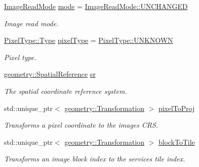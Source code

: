 \begin{DoxyCompactItemize}
\hyperlink{group___imagery_module_ga1db94ae833853b71ed501bb1ea8c1c24}{Image\+Read\+Mode} \hyperlink{structdg_1_1deepcore_1_1imagery_1_1_map_service_image_config_a889a9ec30f6e9aa31a2a02058b2e5598}{mode} = \hyperlink{namespacedg_1_1deepcore_1_1imagery_ga1db94ae833853b71ed501bb1ea8c1c24a46335765005ff44b1fe1e38e5d2ddfcc}{Image\+Read\+Mode\+::\+U\+N\+C\+H\+A\+N\+G\+ED}
\begin{DoxyCompactList}\small\item\em Image read mode. \end{DoxyCompactList}\item 
\hyperlink{namespacedg_1_1deepcore_1_1imagery_1_1_pixel_type_a5f0c62edf4601cbd15e52b381697069d}{Pixel\+Type\+::\+Type} \hyperlink{structdg_1_1deepcore_1_1imagery_1_1_map_service_image_config_a0ecef609731a868150ff3ef3faa2f2ae}{pixel\+Type} = \hyperlink{namespacedg_1_1deepcore_1_1imagery_1_1_pixel_type_a5f0c62edf4601cbd15e52b381697069dab23da115d8c27fe0e3a415fe7cdf8964}{Pixel\+Type\+::\+U\+N\+K\+N\+O\+WN}
\begin{DoxyCompactList}\small\item\em Pixel type. \end{DoxyCompactList}\item 
\hyperlink{classdg_1_1deepcore_1_1geometry_1_1_spatial_reference}{geometry\+::\+Spatial\+Reference} \hyperlink{structdg_1_1deepcore_1_1imagery_1_1_map_service_image_config_a55da203e4d34afdfdfe39f4f1fdafb90}{sr}
\begin{DoxyCompactList}\small\item\em The spatial coordinate reference system. \end{DoxyCompactList}\item 
std\+::unique\+\_\+ptr$<$ \hyperlink{structdg_1_1deepcore_1_1geometry_1_1_transformation}{geometry\+::\+Transformation} $>$ \hyperlink{structdg_1_1deepcore_1_1imagery_1_1_map_service_image_config_aae8a095c9f950f114e113e86b82ecf66}{pixel\+To\+Proj}
\begin{DoxyCompactList}\small\item\em Transforms a pixel coordinate to the image\textquotesingle{}s C\+RS. \end{DoxyCompactList}\item 
std\+::unique\+\_\+ptr$<$ \hyperlink{structdg_1_1deepcore_1_1geometry_1_1_transformation}{geometry\+::\+Transformation} $>$ \hyperlink{structdg_1_1deepcore_1_1imagery_1_1_map_service_image_config_a629792227fe086761b4dc6c608bdef28}{block\+To\+Tile}
\begin{DoxyCompactList}\small\item\em Transforms an image block index to the service\textquotesingle{}s tile index. \end{DoxyCompactList}\item 

\end{DoxyCompactItemize}
